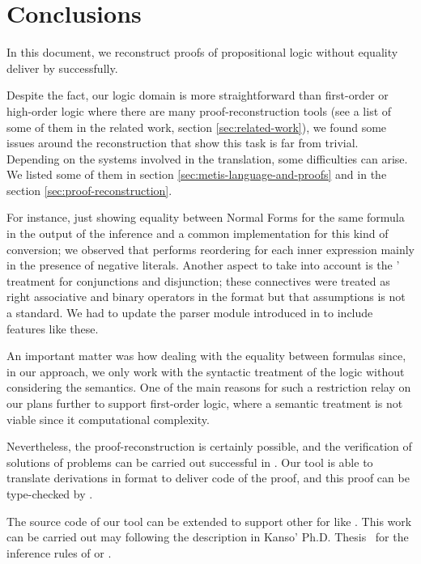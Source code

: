 \documentclass[../main.tex]{subfiles}
\begin{document}

\section{Conclusions}
\label{sec:conclusions}

In this document, we reconstruct proofs
of propositional logic without equality deliver by \Metis
successfully.

Despite the fact, our logic domain is more straightforward than
first-order or high-order logic where there are many
proof-reconstruction tools (see a list of some of them in the
related work, section \ref{sec:related-work}), we found some issues
around the reconstruction that show this task is far from trivial.
Depending  on the systems involved in the translation, some
difficulties can arise. We listed some of them in section
\ref{sec:metis-language-and-proofs} and in the section
\ref{sec:proof-reconstruction}.

For instance, just showing equality between Normal Forms for the
same formula in the output of the \canonicalize inference and a
common implementation for this kind of conversion; we observed that
\Metis performs reordering for each inner expression mainly in the
presence of negative literals. Another aspect to take into account
is the \Metis' treatment for conjunctions and disjunction;
these connectives were treated as right associative and binary
operators in the \TSTP format but that assumptions is not a standard.
We had to update the \TSTP parser module introduced in
\cite{Gomez-Londono2015} to include features like these.

An important matter was how dealing with
the equality between formulas since, in our approach, we only work
with the syntactic treatment of the logic without considering the
semantics.
One of the main reasons for such a restriction relay on our plans
further to support first-order logic, where a semantic treatment is
not viable since it computational complexity.

Nevertheless, the proof-reconstruction is certainly possible, and
the verification of solutions of \CPL problems can be carried out
successful in \Agda. Our tool is able to translate \Metis
derivations in \TSTP format to deliver \Agda code of the proof,
and this proof can be type-checked by \Agda.

The source code of our tool can be extended to support
other \ATPs for \CPL like . This work can be carried out
may following the description in Kanso' Ph.D. Thesis~\cite{Kanso2012}
for the inference rules of  or .
\end{document}
